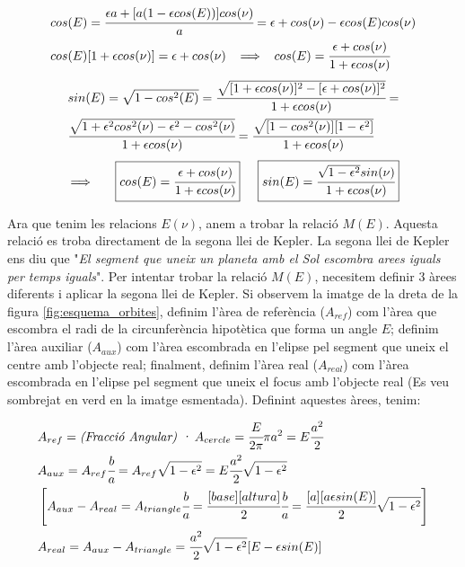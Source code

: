 \documentclass[a4paper, 11pt]{article}
\begin{document}
\begin{align*}
    &cos(E) = \cfrac{\epsilon a + [a(1-\epsilon cos(E))] cos(\nu)}{a} = \epsilon + cos(\nu) - \epsilon cos(E) cos(\nu)\\
    &cos(E)[1+\epsilon cos(\nu)] = \epsilon + cos(\nu) \hspace{2mm} \implies \hspace{2mm} cos(E) = \cfrac{\epsilon + cos(\nu)}{1 + \epsilon cos(\nu)} \\
\end{align*}
\begin{align*}
    &sin(E) = \sqrt{1 - cos^2(E)} = \cfrac{\sqrt{[1+\epsilon cos(\nu)]^2 - [\epsilon + cos(\nu)]^2}}{1+\epsilon cos(\nu)} = \\
    &\cfrac{\sqrt{1 + \epsilon^2 cos^2(\nu) - \epsilon^2 - cos^2(\nu)}}{1+\epsilon cos(\nu)} = \cfrac{\sqrt{[1-cos^2(\nu)][1-\epsilon^2]}}{1+\epsilon cos(\nu)}
\end{align*}
\vspace{2mm}
\begin{equation} \label{relacions_Enu}
    \implies \hspace{5mm} \boxed{cos(E) = \cfrac{\epsilon + cos(\nu)}{1 + \epsilon cos(\nu)}} \hspace{5mm} \boxed{sin(E) = \cfrac{\sqrt{1-\epsilon^2} sin(\nu)}{1 + \epsilon cos(\nu)}}
\end{equation}
\vspace{2mm}

\noindent Ara que tenim les relacions $E(\nu)$, anem a trobar la relació $M(E)$. Aquesta relació es troba directament de la segona llei de Kepler. La segona llei de Kepler ens diu que "\textit{El segment que uneix un planeta amb el Sol escombra arees iguals per temps iguals}". Per intentar trobar la relació $M(E)$, necesitem definir 3 àrees diferents i aplicar la segona llei de Kepler. Si observem la imatge de la dreta de la figura \ref{fig:esquema_orbites}, definim l'àrea de referència ($A_{ref}$) com l'àrea que escombra el radi de la circunferència hipotètica que forma un angle $E$; definim l'àrea auxiliar ($A_{aux}$) com l'àrea escombrada en l'elipse pel segment que uneix el centre amb l'objecte real; finalment, definim l'àrea real ($A_{real}$) com l'àrea escombrada en l'elipse pel segment que uneix el focus amb l'objecte real (Es veu sombrejat en verd en la imatge esmentada). Definint aquestes àrees, tenim:

\begin{align*}
    &A_{ref} = \textit{(Fracció Angular) ·} \hspace{1mm}  A_{cercle} = \cfrac{E}{2\pi}\pi a^2 = E\cfrac{a^2}{2} \\
    &A_{aux} = A_{ref} \cfrac{b}{a} = A_{ref} \sqrt{1-\epsilon^2} = E\cfrac{a^2}{2} \sqrt{1-\epsilon^2} \\
    &\left[ A_{aux} - A_{real} = A_{triangle}\cfrac{b}{a} = \cfrac{[base][altura]}{2}\cfrac{b}{a} = \cfrac{[a][a\epsilon sin(E)]}{2} \sqrt{1-\epsilon ^2} \right] \\
    &A_{real} = A_{aux} - A_{triangle} = \cfrac{a^2}{2} \sqrt{1-\epsilon^2} [E - \epsilon sin(E)] \\
\end{align*}
\end{document}
